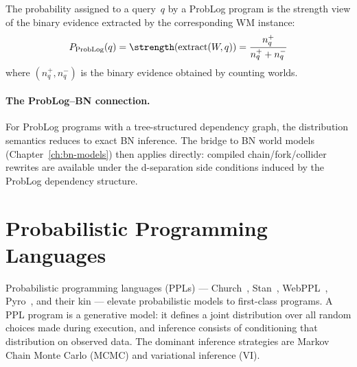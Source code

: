 \begin{proposition}
\label{prop:problog-view}
The probability assigned to a query~$q$ by a ProbLog program is the
strength view of the binary evidence extracted by the corresponding
WM instance:
\[
  P_{\mathrm{ProbLog}}(q) = \strength(\mathrm{extract}(W, q))
  = \frac{n_q^+}{n_q^+ + n_q^-}
\]
where $(n_q^+, n_q^-)$ is the binary evidence obtained by counting
worlds.
\end{proposition}

\paragraph{The ProbLog--BN connection.}
For ProbLog programs with a tree-structured dependency graph, the
distribution semantics reduces to exact BN inference.  The bridge
to BN world models (Chapter~\ref{ch:bn-models}) then applies
directly: compiled chain/fork/collider rewrites are available under
the d-separation side conditions induced by the ProbLog dependency
structure.



\section{Probabilistic Programming Languages}
\label{sec:bridge-ppl}

Probabilistic programming languages (PPLs) --- Church~\cite{Goodman2008Church},
Stan~\cite{Carpenter2017Stan}, WebPPL~\cite{Goodman2014WebPPL},
Pyro~\cite{Bingham2019Pyro}, and their kin --- elevate probabilistic
models to first-class programs.  A PPL program is a generative model:
it defines a joint distribution over all random choices made during
execution, and inference consists of conditioning that distribution on
observed data.  The dominant inference strategies are Markov Chain Monte
Carlo (MCMC) and variational inference (VI).


